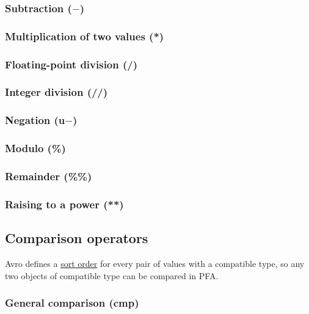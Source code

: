 \documentclass{article}
\theoremstyle{definition}
\begin{document}
\subsubsection{Subtraction ($-$)}
\libfcn{-}

\subsubsection{Multiplication of two values (*)}
\libfcn{*}

\subsubsection{Floating-point division (/)}
\libfcn{/}

\subsubsection{Integer division (//)}
\libfcn{//}

\subsubsection{Negation (u$-$)}

\subsubsection{Modulo (\%)}
\libfcn{\%}

\subsubsection{Remainder (\%\%)}
\libfcn{\%\%}

\subsubsection{Raising to a power (**)}
\libfcn{**}

\subsection{Comparison operators}

Avro defines a \href{http://avro.apache.org/docs/1.7.6/spec.html#order}{sort order} for every pair of values with a compatible type, so any two objects of compatible type can be compared in PFA.

\subsubsection{General comparison (cmp)}
\end{document}
